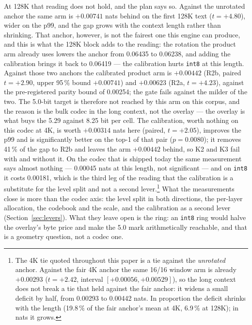 \documentclass[10pt,twocolumn]{article}
\begin{document}
At 128K that reading does not hold, and the plan says so. Against the unrotated anchor the same arm is $+0.00741$ nats behind on the first 128K text ($t = +4.80$), wider on the p99, and the gap grows with the context length rather than shrinking. That anchor, however, is not the fairest one this engine can produce, and this is what the 128K block adds to the reading: the rotation the product arm already uses lowers the anchor from 0.06435 to 0.06238, and adding the calibration brings it back to 0.06419 --- the calibration hurts \texttt{int8} at this length. Against those two anchors the calibrated product arm is $+0.00442$ (R2b, paired $t = +2.90$, upper 95\,\% bound $+0.00741$) and $+0.00623$ (R2a, $t = +4.23$), against the pre-registered parity bound of 0.00254; the gate fails against the milder of the two. The 5.0-bit target is therefore not reached by this arm on this corpus, and the reason is the bulk codec in the long context, not the overlay --- the overlay is what buys the 5.29 against 8.25 bit per cell. The calibration, worth nothing on this codec at 4K, is worth $+0.00314$ nats here (paired, $t = +2.05$), improves the p99 and is significantly better on the top-1 of that pair ($p = 0.0080$); it removes 41\,\% of the gap to R2b and leaves the arm $+0.00442$ behind, so K2 and K3 fail with and without it. On the codec that is shipped today the same measurement says almost nothing --- 0.00045 nats at this length, not significant --- and on \texttt{int8} it costs 0.00181, which is the third leg of the reading that the calibration is a substitute for the level split and not a second lever.\footnote{The 4K tie quoted throughout this paper is a tie against the \emph{unrotated} anchor. Against the fair 4K anchor the same 16/16 window arm is already $+0.00293$ ($t = +2.42$, interval $[+0.00056, +0.00529]$), so the long context does not break a tie that held against the fair anchor: it widens a small deficit by half, from 0.00293 to 0.00442 nats. In proportion the deficit shrinks with the length (19.8\,\% of the fair anchor's mean at 4K, 6.9\,\% at 128K); in nats it grows.} What the measurements close is more than the codec axis: the level split in both directions, the per-layer allocation, the codebook and the scale, and the calibration as a second lever (Section~\ref{sec:levers}). What they leave open is the ring: an \texttt{int8} ring would halve the overlay's byte price and make the 5.0 mark arithmetically reachable, and that is a geometry question, not a codec one.
\end{document}
